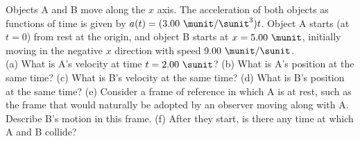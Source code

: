 
Objects A and B move along the $x$ axis. The acceleration of
both objects as functions of time is given by $a(t) =
(3.00\ \munit/\sunit^3)t$. Object A
starts (at $t=0$) from rest at the origin, and object B starts at $x
= 5.00\ \munit$, initially moving in the negative $x$ direction with speed
$9.00\ \munit/\sunit$.\\
(a) What is A's velocity at time $t = 2.00\ \sunit$?\answercheck\hwendpart
%
(b) What is A's position at the same time?\answercheck\hwendpart
%
(c) What is B's velocity at the same time?\answercheck\hwendpart
%
(d) What is B's position at the same time?\answercheck\hwendpart
%
(e) Consider a frame of reference in which A is at rest, such as the frame that would
naturally be adopted by an observer moving along with A. Describe B's motion in this frame.\hwendpart
%
(f) After they start, is there any time at which A and B collide?
